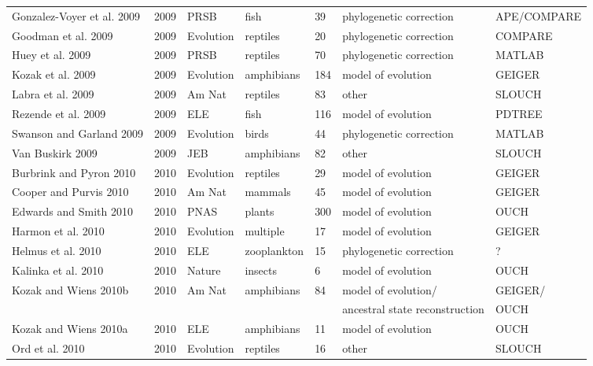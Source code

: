 \begin{landscape}
\begin{center}
\begin{longtable}{p{6cm}llllll}
Gonzalez-Voyer et al. 2009    &   2009    &   PRSB    &   fish    &   39  &   phylogenetic correction &   APE/COMPARE \\
Goodman et al. 2009   &   2009    &   Evolution   &   reptiles    &   20  &   phylogenetic correction &   COMPARE \\
Huey et al. 2009  &   2009    &   PRSB    &   reptiles    &   70  &   phylogenetic correction &   MATLAB  \\
Kozak et al. 2009 &   2009    &   Evolution   &   amphibians  &   184 &   model of evolution  &   GEIGER  \\
Labra et al. 2009 &   2009    &   Am Nat  &   reptiles    &   83  &   other   &   SLOUCH  \\
Rezende et al. 2009   &   2009    &   ELE &   fish    &   116 &   model of evolution  &   PDTREE  \\
Swanson and Garland 2009  &   2009    &   Evolution   &   birds   &   44  &   phylogenetic correction &   MATLAB  \\
Van Buskirk 2009  &   2009    &   JEB &   amphibians  &   82  &   other   &   SLOUCH  \\
Burbrink and Pyron 2010   &   2010    &   Evolution   &   reptiles    &   29  &   model of evolution  &   GEIGER  \\
Cooper and Purvis 2010    &   2010    &   Am Nat  &   mammals &   45  &   model of evolution  &   GEIGER  \\
Edwards and Smith 2010    &   2010    &   PNAS    &   plants  &   300 &   model of evolution  &   OUCH    \\
Harmon et al. 2010    &   2010    &   Evolution   &   multiple    &   17  &   model of evolution  &   GEIGER  \\
Helmus et al. 2010    &   2010    &   ELE &   zooplankton &   15  &   phylogenetic correction &   ?   \\
Kalinka et al. 2010   &   2010    &   Nature  &   insects &   6   &   model of evolution  &   OUCH    \\
Kozak and Wiens 2010b &   2010    &   Am Nat  &   amphibians  &   84  &   model of evolution/ &   GEIGER/ \\
    &       &       &       &       &   ancestral state reconstruction  &   OUCH    \\
Kozak and Wiens 2010a &   2010    &   ELE &   amphibians  &   11  &   model of evolution  &   OUCH    \\
Ord et al. 2010   &   2010    &   Evolution   &   reptiles    &   16  &   other   &   SLOUCH  \\

\end{longtable}
\end{center}
\end{landscape}
